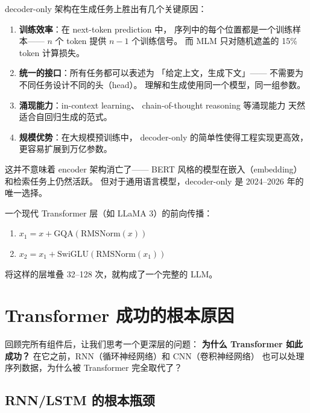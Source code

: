 \begin{whybox}
decoder-only 架构在生成任务上胜出有几个关键原因：
\begin{enumerate}[noitemsep]
  \item \textbf{训练效率}：在 next-token prediction 中，
        序列中的每个位置都是一个训练样本——
        $n$ 个 token 提供 $n-1$ 个训练信号。
        而 MLM 只对随机遮盖的 15\% token 计算损失。
  \item \textbf{统一的接口}：所有任务都可以表述为
        「给定上文，生成下文」——
        不需要为不同任务设计不同的头（head）。
        理解和生成使用同一个模型，同一组参数。
  \item \textbf{涌现能力}：in-context learning、
        chain-of-thought reasoning 等涌现能力
        天然适合自回归生成的范式。
  \item \textbf{规模优势}：在大规模预训练中，
        decoder-only 的简单性使得工程实现更高效，
        更容易扩展到万亿参数。
\end{enumerate}
这并不意味着 encoder 架构消亡了——
BERT 风格的模型在嵌入（embedding）和检索任务上仍然活跃。
但对于通用语言模型，decoder-only 是 2024--2026 年的唯一选择。
\end{whybox}

\begin{keybox}
一个现代 Transformer 层（如 LLaMA 3）的前向传播：
\begin{enumerate}[noitemsep]
  \item $x_1 = x + \mathrm{GQA}(\mathrm{RMSNorm}(x))$
  \item $x_2 = x_1 + \mathrm{SwiGLU}(\mathrm{RMSNorm}(x_1))$
\end{enumerate}
将这样的层堆叠 32--128 次，就构成了一个完整的 LLM。
\end{keybox}

\section{Transformer 成功的根本原因}

回顾完所有组件后，让我们思考一个更深层的问题：
\textbf{为什么 Transformer 如此成功？}
在它之前，RNN（循环神经网络）和 CNN（卷积神经网络）
也可以处理序列数据，为什么被 Transformer 完全取代了？

\subsection{RNN/LSTM 的根本瓶颈}

